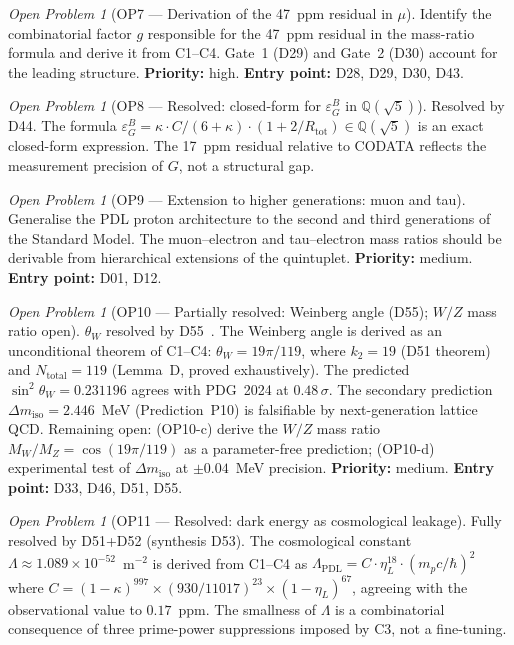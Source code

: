 \documentclass[11pt,a4paper]{article}
\theoremstyle{plain}
\theoremstyle{definition}
\theoremstyle{remark}
\newtheorem{openproblem}[theorem]{Open Problem}
\newcommand{\Rtot}{R_{\mathrm{tot}}}
\newcommand{\epsGeomB}{\varepsilon_G^B}
\begin{document}
\begin{openproblem}[OP7 --- Derivation of the 47~ppm residual in $\mu$]
\label{op:residual}
Identify the combinatorial factor $g$ responsible for the 47~ppm residual in the mass-ratio formula and derive it from C1--C4. Gate~1 (D29) and Gate~2 (D30) account for the leading structure. \textbf{Priority:} high. \textbf{Entry point:} D28, D29, D30, D43.
\end{openproblem}

\begin{openproblem}[OP8 --- Resolved: closed-form for $\epsGeomB$ in $\mathbb{Q}(\sqrt{5})$]
\label{op:epsGeomB}
\textcolor{proofblue}{Resolved by D44.} The formula $\epsGeomB = \kappa \cdot C/(6+\kappa)\cdot(1+2/\Rtot) \in \mathbb{Q}(\sqrt{5})$ is an exact closed-form expression. The 17~ppm residual relative to CODATA reflects the measurement precision of $G$, not a structural gap.
\end{openproblem}

\begin{openproblem}[OP9 --- Extension to higher generations: muon and tau]
\label{op:generations}
Generalise the PDL proton architecture to the second and third generations of the Standard Model. The muon--electron and tau--electron mass ratios should be derivable from hierarchical extensions of the quintuplet. \textbf{Priority:} medium. \textbf{Entry point:} D01, D12.
\end{openproblem}

\begin{openproblem}[OP10 --- Partially resolved: Weinberg angle (D55); $W/Z$ mass ratio open]
\label{op:weak}
\textcolor{proofblue}{$\theta_W$ resolved by D55~\cite{D55}.} The Weinberg angle is derived as an unconditional theorem of C1--C4: $\theta_W = 19\pi/119$, where $k_2 = 19$ (D51 theorem) and $N_{\mathrm{total}} = 119$ (Lemma~D, proved exhaustively). The predicted $\sin^2\theta_W = 0.231196$ agrees with PDG~2024 at $0.48\,\sigma$. The secondary prediction $\Delta m_{\mathrm{iso}} = 2.446$~MeV (Prediction~P10) is falsifiable by next-generation lattice QCD. Remaining open: (OP10-c) derive the $W/Z$ mass ratio $M_W/M_Z = \cos(19\pi/119)$ as a parameter-free prediction; (OP10-d) experimental test of $\Delta m_{\mathrm{iso}}$ at $\pm 0.04$~MeV precision. \textbf{Priority:} medium. \textbf{Entry point:} D33, D46, D51, D55.
\end{openproblem}

\begin{openproblem}[OP11 --- Resolved: dark energy as cosmological leakage]
\label{op:darkenergy}
\textcolor{proofblue}{Fully resolved by D51+D52 (synthesis D53).} The cosmological constant $\Lambda \approx 1.089 \times 10^{-52}$~m$^{-2}$ is derived from C1--C4 as $\Lambda_{\mathrm{PDL}} = C \cdot \eta_L^{18} \cdot (m_p c/\hbar)^2$ where $C = (1-\kappa)^{997} \times (930/11017)^{23} \times (1-\eta_L)^{67}$, agreeing with the observational value to $0.17$~ppm. The smallness of $\Lambda$ is a combinatorial consequence of three prime-power suppressions imposed by C3, not a fine-tuning.
\end{openproblem}
\end{document}
